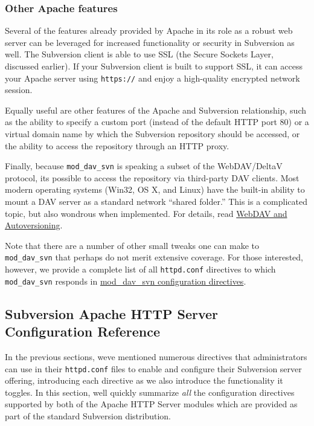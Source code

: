 \subsubsection{Other Apache
features}\label{svn.serverconfig.httpd.extra.other}

Several of the features already provided by Apache in its role as a
robust web server can be leveraged for increased functionality or
security in Subversion as well. The Subversion client is able to use SSL
(the Secure Sockets Layer, discussed earlier). If your Subversion client
is built to support SSL, it can access your Apache server using
\texttt{https://} and enjoy a high-quality encrypted network session.

Equally useful are other features of the Apache and Subversion
relationship, such as the ability to specify a custom port (instead of
the default HTTP port 80) or a virtual domain name by which the
Subversion repository should be accessed, or the ability to access the
repository through an HTTP proxy.

Finally, because \texttt{mod\_dav\_svn} is speaking a subset of the
WebDAV/DeltaV protocol, it\textquotesingle s possible to access the
repository via third-party DAV clients. Most modern operating systems
(Win32, OS X, and Linux) have the built-in ability to mount a DAV server
as a standard network ``shared folder.'' This is a complicated topic,
but also wondrous when implemented. For details, read
\hyperref[svn.webdav]{WebDAV and Autoversioning}.

Note that there are a number of other small tweaks one can make to
\texttt{mod\_dav\_svn} that perhaps do not merit extensive coverage. For
those interested, however, we provide a complete list of all
\texttt{httpd.conf} directives to which \texttt{mod\_dav\_svn} responds
in \hyperref[svn.serverconfig.httpd.ref.mod_dav_svn]{mod\_dav\_svn
configuration directives}.

\subsection{Subversion Apache HTTP Server Configuration
Reference}\label{svn.serverconfig.httpd.ref}

In the previous sections, we\textquotesingle ve mentioned numerous
directives that administrators can use in their \texttt{httpd.conf}
files to enable and configure their Subversion server offering,
introducing each directive as we also introduce the functionality it
toggles. In this section, we\textquotesingle ll quickly summarize
\emph{all} the configuration directives supported by both of the Apache
HTTP Server modules which are provided as part of the standard
Subversion distribution.

